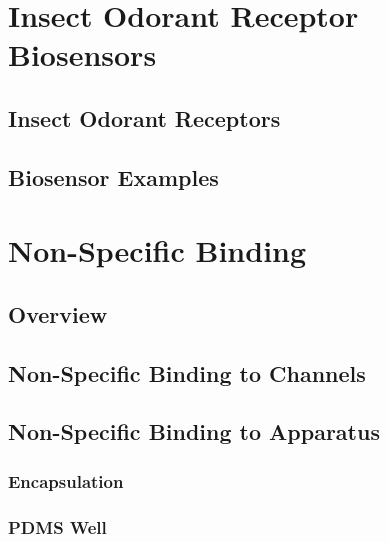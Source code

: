 \documentclass[
  a4paper,
]{scrbook}
\begin{document}
\hypertarget{insect-odorant-receptor-biosensors}{%
\section{Insect Odorant Receptor
Biosensors}\label{insect-odorant-receptor-biosensors}}

\hypertarget{insect-odorant-receptors}{%
\subsection{Insect Odorant Receptors}\label{insect-odorant-receptors}}

\hypertarget{biosensor-examples}{%
\subsection{Biosensor Examples}\label{biosensor-examples}}

\hypertarget{non-specific-binding}{%
\section{Non-Specific Binding}\label{non-specific-binding}}

\hypertarget{sec-non-specific-binding}{%
\subsection{Overview}\label{sec-non-specific-binding}}

\hypertarget{non-specific-binding-to-channels}{%
\subsection{Non-Specific Binding to
Channels}\label{non-specific-binding-to-channels}}

\hypertarget{non-specific-binding-to-apparatus}{%
\subsection{Non-Specific Binding to
Apparatus}\label{non-specific-binding-to-apparatus}}

\hypertarget{encapsulation}{%
\subsubsection*{Encapsulation}\label{encapsulation}}

\hypertarget{pdms-well}{%
\subsubsection*{PDMS Well}\label{pdms-well}}
\end{document}
